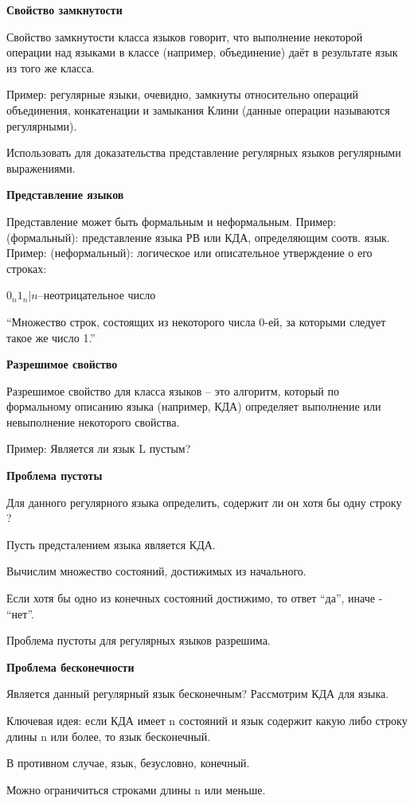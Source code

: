 \documentclass{article}
\begin{document}
\textbf{Свойство замкнутости}

Свойство замкнутости класса языков говорит, что выполнение
некоторой операции над языками в классе (например,
объединение) даёт в результате язык из того же класса.

Пример: регулярные языки, очевидно, замкнуты относительно
операций объединения, конкатенации и замыкания Клини
(данные операции называются регулярными).

Использовать для доказательства представление регулярных языков
регулярными выражениями.

\textbf{Представление языков}



Представление может быть формальным и неформальным.
Пример: (формальный): представление языка РВ или КДА,
определяющим соотв. язык.
Пример: (неформальный): логическое или описательное
утверждение о его строках:

${0_n1_n | n – \text{неотрицательное число}}$

“Множество строк, состоящих из некоторого числа 0-ей, за которыми
следует такое же число 1.”



\textbf{Разрешимое свойство}

Разрешимое свойство для класса языков – это алгоритм,
который по формальному описанию языка (например, КДА)
определяет выполнение или невыполнение некоторого
свойства.

Пример: Является ли язык L пустым?

\textbf{Проблема пустоты}

Для данного регулярного языка определить, содержит ли он
хотя бы одну строку ?

Пусть предсталением языка является КДА.

Вычислим множество состояний, достижимых из
начального.

Если хотя бы одно из конечных состояний достижимо, то
ответ “да”, иначе - “нет”.

Проблема пустоты для регулярных языков разрешима.


\textbf{Проблема бесконечности}


Является данный регулярный язык бесконечным?
Рассмотрим КДА для языка.

Ключевая идея: если КДА имеет n состояний и язык содержит
какую либо строку длины n или более, то язык бесконечный.

В противном случае, язык, безусловно, конечный.

Можно ограничиться строками длины n или меньше.
\end{document}
